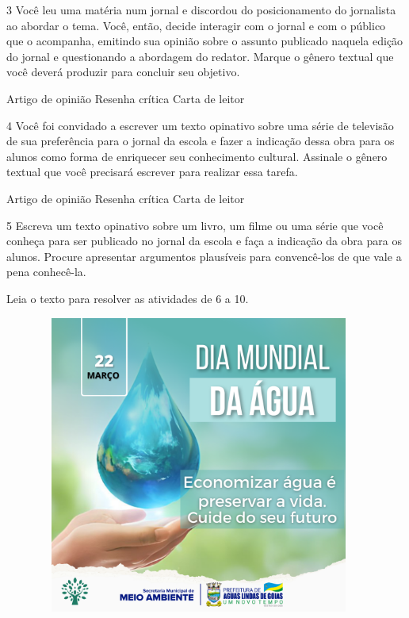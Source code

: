 \num{3} Você leu uma matéria num jornal e discordou do posicionamento do
jornalista ao abordar o tema. Você, então, decide interagir com o jornal
e com o público que o acompanha, emitindo sua opinião sobre o assunto
publicado naquela edição do jornal e questionando a abordagem do
redator. Marque o gênero textual que você deverá produzir para concluir
seu objetivo.

\begin{boxlist}
 Artigo de opinião
 Resenha crítica
 Carta de leitor
\end{boxlist}

\num{4} Você foi convidado a escrever um texto opinativo sobre uma série
de televisão de sua preferência para o jornal da escola e fazer a
indicação dessa obra para os alunos como forma de enriquecer seu
conhecimento cultural. Assinale o gênero textual que você precisará
escrever para realizar essa tarefa.

\begin{boxlist}
 Artigo de opinião
 Resenha crítica
 Carta de leitor
\end{boxlist}

\num{5} Escreva um texto opinativo sobre um livro, um filme ou uma série
que você conheça para ser publicado no jornal da escola e faça a
indicação da obra para os alunos. Procure apresentar argumentos
plausíveis para convencê-los de que vale a pena conhecê-la.


Leia o texto para resolver as atividades de 6 a 10.

\begin{figure}[H]
\centering
\includegraphics[width=4.21103in,height=3.86458in]{./imgSAEB_8_POR/media/image41.png}
\end{figure}

